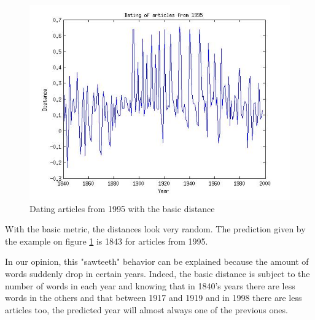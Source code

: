 \begin{figure}[H]
\begin{minipage}[b]{0.3\linewidth}
    \end{minipage}\hfill
    \begin{minipage}[b]{0.3\linewidth}
	\includegraphics[scale=0.25]{Pictures/date_articles/distance1/dating1995_corrected.jpg}
        \caption{Dating articles from 1995 with the basic distance}
    \end{minipage}
    \label{date_d1}
\end{figure}
With the basic metric, the distances look very random. The prediction given by the example on figure \ref{date_d1} is 1843 for articles from 1995.

In our opinion, this "sawteeth" behavior can be explained because the amount of words suddenly drop in certain years. Indeed, the basic distance is subject to the number of words in each year and knowing that in 1840's years there are less words in the others and that between 1917 and 1919 and in 1998 there are less articles too, the predicted year will almost always one of the previous ones.
